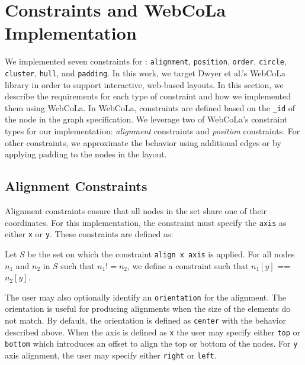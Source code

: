 \section{\projectname Constraints and WebCoLa Implementation}
\label{sec:constraints}
We implemented seven constraints for \projectname: 
\texttt{alignment}, \texttt{position}, \texttt{order}, \texttt{circle},
\texttt{cluster}, \texttt{hull}, and \texttt{padding}. In this work, we
target  Dwyer et al.'s WebCoLa library \cite{WebCoLa} in order to support
interactive, web-based layouts. In this section, we describe the requirements 
for each type of constraint and how we implemented them using WebCoLa. 
In WebCoLa, constraints are defined based on the \texttt{\_id} of the
node in the graph specification. We leverage two of WebCoLa's
constraint types for our implementation: \emph{alignment} constraints 
and \emph{position} constraints. For other \projectname constraints, we
approximate the behavior using additional edges or by applying padding
to the nodes in the layout.

\subsection{Alignment Constraints}
Alignment constraints ensure that all nodes in the set share one of their
coordinates. For this implementation, the constraint must specify the \texttt{axis}
as either \texttt{x} or \texttt{y}. These constraints are defined as:

\begin{definition}
Let $S$ be the set on which the constraint \texttt{align x axis} is applied.
For all nodes $n_1$ and $n_2$ in $S$ such that $n_1 != n_2$, we define 
a constraint such that $n_1[y]$ == $n_2[y]$.
\end{definition}


The user may also optionally identify an \texttt{orientation} for the alignment.
The orientation is useful for producing alignments when the size of the 
elements do not match. By default, the orientation is defined as \texttt{center} 
with the behavior described above. When the axis is defined as \texttt{x} 
the user may specify either \texttt{top} or \texttt{bottom} which introduces 
an offset to align the top or bottom of the nodes. For \texttt{y} axis
alignment, the user may specify either \texttt{right} or \texttt{left}.

